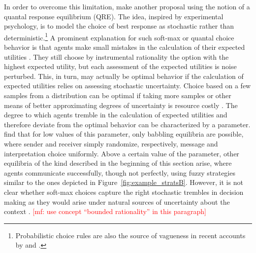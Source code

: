 \documentclass[a4paper]{article}
\newcommand{\mf}[1]{\textcolor{Red}{[mf: #1]}}
\begin{document}
In order to overcome this limitation, \citeauthor{franke_vagueness_2011} make another proposal using the notion of a quantal response equilibrium (QRE).
The idea, inspired by experimental psychology, is to model the choice of best response as stochastic rather than deterministic.\footnote{Probabilistic choice rules are also the source of vagueness in recent accounts by \textcite{LassiterGoodman2015:Adjectival-vagu} and \textcite{QingFranke2014:Gradable-Adject}.} 
A prominent explanation for such soft-max or quantal choice behavior is that agents make small mistakes in the calculation of their expected utilities \parencite{Train2009:Discrete-Choice}. 
They still choose by instrumental rationality the option with the highest expected utility, but each assessment of the expected utilities is noise perturbed.
This, in turn, may actually be optimal behavior if the calculation of expected utilities relies on assessing stochastic uncertainty. 
Choice based on a few samples from a distribution can be optimal if taking more samples or other means of better approximating degrees of uncertainty is resource costly \parencite[\emph{e.g.}][]{VulGoodman2014:One-and-Done-Op,SanbornChater2016:Bayesian-Brains}.
The degree to which agents tremble in the calculation of expected utilities and therefore deviate from the optimal behavior can be characterized by a parameter.
\citeauthor{franke_vagueness_2011} find that for low values of this parameter, only babbling equilibria are possible, where sender and receiver simply randomize, respectively, message and interpretation choice uniformly.
Above a certain value of the parameter, other equilibria of the kind described in the beginning of this section arise, where agents communicate successfully, though not perfectly, using fuzzy strategies similar to the ones depicted in Figure~\ref{fig:example_stratsB}. However, it is not clear whether soft-max choices capture the right stochastic trembles in decision making as they would arise under natural sources of uncertainty about the context \parencite[see][]{franke_vagueness_2017}.
\mf{use concept ``bounded rationality'' in this paragraph}
\end{document}
